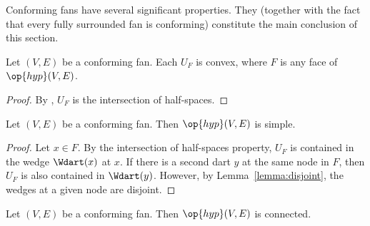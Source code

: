 Conforming fans have several significant properties.   They
(together with the fact that every fully surrounded fan is conforming) constitute
the main conclusion of this section.  

\begin{lemma}[]
Let $(V,E)$ be a conforming fan.  
Each $U_F$ is convex, where  $F$ is any face of $\op{hyp}(V,E)$.
\end{lemma}
%
%

\begin{proof} By , $U_F$ is the intersection of
half-spaces.
\end{proof}

\begin{lemma}[]  
Let $(V,E)$ be a conforming fan.  
Then $\op{hyp}(V,E)$ is simple.
\end{lemma}
%

\begin{proof} Let $x\in F$.  By the intersection of half-spaces
property, $U_F$ is contained in the wedge $\Wdart(x)$ at $x$.  If
there is a second dart $y$ at the same node in $F$, then $U_F$ is
also contained in $\Wdart(y)$. However, by
Lemma~\ref{lemma:disjoint}, the wedges at a given node are disjoint.
\end{proof}

\begin{lemma}[]  
Let $(V,E)$ be a conforming fan.  
Then $\op{hyp}(V,E)$ is connected.
\end{lemma}
%
%
%


